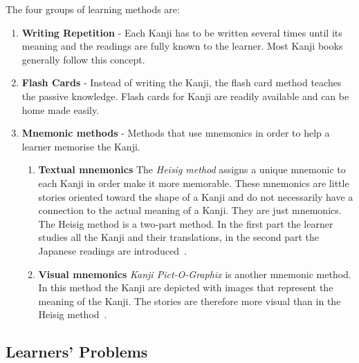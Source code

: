 The four groups of learning methods are:
\begin{enumerate}
  \item \textbf{Writing Repetition} - Each Kanji has to be written several times
        until its meaning and the readings are fully known to the learner.
        Most Kanji books generally follow this concept.

  \item \textbf{Flash Cards} - Instead of writing the Kanji, the flash card 
        method teaches the passive knowledge. Flash cards for Kanji are readily
        available and can be home made easily.

  \item \textbf{Mnemonic methods} - Methods that use mnemonics in order to help
        a learner memorise the Kanji.
        \begin{enumerate}
          \item \textbf{Textual mnemonics} The \emph{Heisig method} assigns a 
                unique mnemonic to each Kanji in order make it more memorable. 
                These mnemonics are little stories oriented toward the shape
                of a Kanji and do not necessarily have a connection to the 
                actual meaning of a Kanji. They are just mnemonics. 
                The Heisig method is a two-part method. In the first part
                the learner studies all the Kanji and their translations, 
                in the second part the Japanese readings are 
                introduced~.

          \item \textbf{Visual mnemonics} \emph{Kanji Pict-O-Graphix} is 
                another mnemonic method. In this method the Kanji are 
                depicted with images that represent the meaning of the Kanji.
                The stories are therefore more visual than in the Heisig 
                method~.
          \end{enumerate}
\end{enumerate}


\subsection{Learners' Problems}
\label{sec:learnersproblems}

